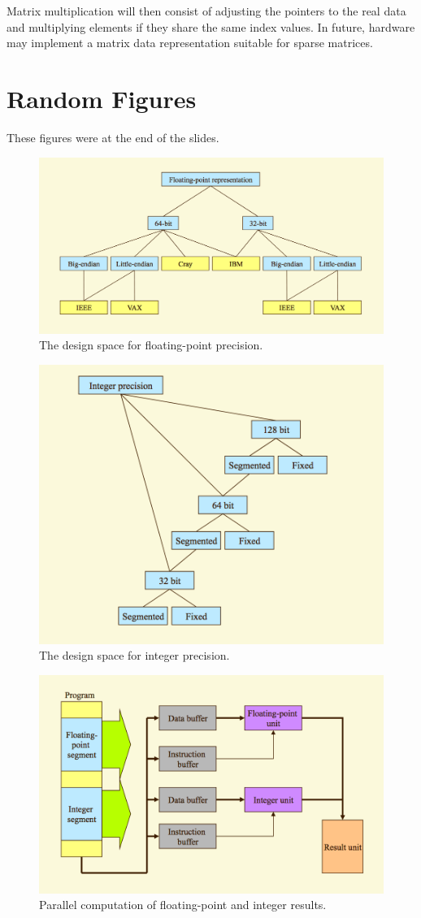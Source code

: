 Matrix multiplication will then consist of adjusting the pointers to the real data and multiplying elements if they share the same index values. In future, hardware may implement a matrix data representation suitable for sparse matrices.

\section{Random Figures}
These figures were at the end of the slides.

\begin{figure}
\centering
\includegraphics[width=0.5\linewidth]{figures/screenshot087}
\caption{The design space for floating-point precision.}
\label{fig:screenshot087}
\end{figure}

\begin{figure}
\centering
\includegraphics[width=0.5\linewidth]{figures/screenshot088}
\caption{The design space for integer precision.}
\label{fig:screenshot088}
\end{figure}

\begin{figure}
\centering
\includegraphics[width=0.5\linewidth]{figures/screenshot089}
\caption{Parallel computation of floating-point and integer results.}
\label{fig:screenshot089}
\end{figure}

